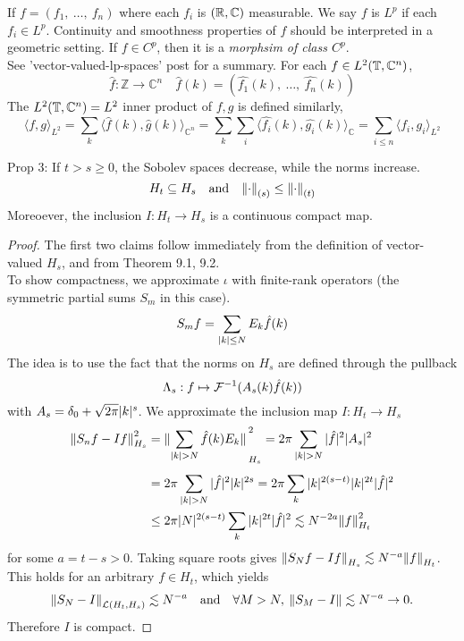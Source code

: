 \documentclass[../main-v2-manifolds.tex]{subfiles}
\begin{document}
If $f = (f_1,\: \ldots, \: f_n)$ where each $f_i$ is $(\mathbb{R},\mathbb{C})$ measurable. We say $f$ is $L^p$ if each $f_i\in L^p$. Continuity and smoothness properties of $f$ should be interpreted in a geometric setting. If $f\in C^p$, then it is a \emph{morphsim of class $C^p$}.\\
See 'vector-valued-lp-spaces' post for a summary.
For each $f\in L^2(\mathbb{T}, \mathbb{C}^n)$, 
\[
\hat{f}:\mathbb{Z}\to\mathbb{C}^n\quad \hat{f}(k) = (\hat{f_1}(k),\:\ldots,\:\hat{f_n}(k))
\]
The $L^2(\mathbb{T},\mathbb{C}^n)=L^2$ inner product of $f,g$ is defined similarly,
\[
\langle f,g\rangle_{L^2} = \sum_k \langle \hat{f}(k),\hat{g}(k)\rangle_{\mathbb{C}^n} =\sum_k\sum_i\langle\hat{f_i}(k),\hat{g_i} (k)\rangle_{\mathbb{C}} =\sum_{i\leq n}\langle f_i,g_i\rangle_{L^2}
\]
\begin{wts}
Prop 3: If $t>s\geq 0$, the Sobolev spaces decrease, while the norms increase.
\[
H_t\subseteq H_s\quad\text{and}\quad \norm{\cdot}_{(s)}\leq\norm{\cdot}_{(t)}
\]
Moreoever, the inclusion $I: H_t\to H_s$ is a continuous compact map.
\end{wts}
\begin{proof}
The first two claims follow immediately from the definition of vector-valued $H_s$, and from Theorem 9.1, 9.2.\\

To show compactness, we approximate $\iota$ with finite-rank operators (the symmetric partial sums $S_m$ in this case).
\[
S_m f = \sum_{\vert {k} \vert \leq N} E_k\hat{f}(k)
\]
The idea is to use the fact that the norms on $H_s$ are defined through the pullback
\[
\Lambda_s: f\mapsto \mathcal{F}^{-1}(A_s(k)\hat{f}(k))
\]
with $A_s = \delta_0 + \sqrt{2\pi}\vert {k} \vert^{s}$. We approximate the inclusion map $I: H_t\to H_s$
\begin{align*}
\norm{S_n f - If}_{H_s}^{2} &= \norm*{\sum_{\vert {k} \vert > N}\hat{f}(k)E_k }_{H_s}^{2}=2\pi\sum_{{\vert {k} \vert> N}}\vert {\hat{f}} \vert^2\vert {A_s} \vert^2\\[1ex]
&=2\pi\sum_{\vert {k} \vert> N}\vert {\hat{f}} \vert^2\vert {k} \vert^{2s}=2\pi\sum_{k}\vert {k} \vert^{2(s-t)} \vert {k} \vert^{2t}\vert {\hat{f}} \vert^2\\
&\leq 2\pi\vert {N} \vert^{2(s-t)}\sum_{k}\vert {k} \vert^{2t}\vert {\hat{f}} \vert^2\lesssim N^{-2a}\norm{f}^2_{H_t}
\end{align*}
for some $a = t-s > 0$. Taking square roots gives $\norm{S_N f - If}_{H_s}\lesssim N^{-a}\norm{f}_{H_t}$. This holds for an arbitrary $f\in H_t$, which yields
\[
\norm{S_N -I}_{\mathcal{L}(H_t, H_s)}\lesssim N^{-a}\quad\text{and}\quad\forall M>N,\: \norm{S_M - I}\lesssim N^{-a}\to 0.
\]
Therefore $I$ is compact.
\end{proof}
\end{document}
